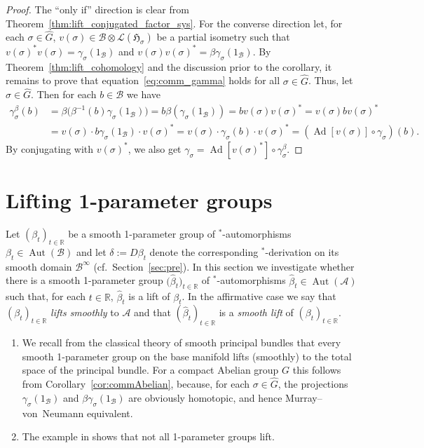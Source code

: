 \documentclass[10pt,a4paper]{amsart}
\numberwithin{equation}{section}
\newcommand*{\R}{\mathbb R}		%
\newcommand*{\tensor}{\otimes}		%
\DeclareMathOperator{\Ad}{Ad}		%
\DeclareMathOperator{\Aut}{Aut}
\newcommand*{\Star}{$^*$\nobreakdash}
\newcommand*{\hilb}{\mathfrak}		%
\newcommand*{\alg}{\mathcal}		%
\newcommand*{\hH}{\hilb{H}}			%
\newcommand*{\one}{1}				%
\newcommand*{\aA}{\alg{A}}			%
\newcommand*{\aB}{\alg{B}} 			%
\newcommand*{\End}{\mathcal{L}} %
\begin{document}
\begin{proof}
	The ``only if'' direction is clear from Theorem~\ref{thm:lift_conjugated_factor_sys}.
	For the converse direction let, for each $\sigma \in \hat G$, $v(\sigma) \in \aB \tensor \End(\hH_\sigma)$ be a partial isometry such that $v(\sigma)^* v(\sigma) = \gamma_\sigma(\one_\aB)$ and $v(\sigma) v(\sigma)^* = \beta\gamma_\sigma(\one_\aB)$.
	By Theorem~\ref{thm:lift_cohomology} and the discussion prior to the corollary, it remains to prove that equation~\eqref{eq:comm_gamma} holds for all $\sigma \in \hat G$.
	Thus, let $\sigma \in \hat G$.
	Then for each $b \in \aB$ we have
	\begin{align*}
		\gamma^\beta_\sigma(b)
		&=
		\beta\big( \beta^{-1}(b) \gamma_\sigma(\one_\aB) \big)
		= b \beta ( \gamma_\sigma(\one_\aB) )
		= b v(\sigma) v(\sigma)^*
		= v(\sigma) b v(\sigma)^*
		\\
		&=
		v(\sigma) \cdot b\gamma_\sigma(\one_\aB) \cdot v(\sigma)^*
		= v(\sigma) \cdot \gamma_\sigma(b) \cdot v(\sigma)^*
		= ( \Ad[v(\sigma)] \circ \gamma_\sigma ) (b).
	\end{align*}
	By conjugating with $v(\sigma)^*$, we also get $\gamma_\sigma = \Ad[v(\sigma)^*] \circ \gamma_\sigma^\beta$.
\end{proof}

\section{Lifting 1-parameter groups}\label{sec:1-para}

Let $(\beta_t)_{t \in \R}$ be a smooth 1-parameter group of \Star-automorphisms $\beta_t \in \Aut(\aB)$ and let $\delta := D\beta_t$ denote the corresponding \Star-derivation on its smooth domain $\aB^\infty$ (cf.\ Section~\ref{sec:pre}).
In this section we investigate whether there is a smooth 1-parameter group $\big(\hat\beta_t\big)_{t \in \R}$ of \Star-automorphisms $\hat\beta_t \in \Aut(\aA)$ such that, for each $t \in \R$, $\hat\beta_t$ is a lift of $\beta_t$.
In the affirmative case we say that $(\beta_t)_{t \in\R}$ \emph{lifts smoothly} to $\aA$ and that $(\hat\beta_t)_{t \in \R}$ is a \emph{smooth lift} of $(\beta_t)_{t \in \R}$.

\begin{Example}\quad
	\begin{enumerate}\itemsep=0pt
	\item
		We recall from the classical theory of smooth principal bundles that every smooth 1-pa\-ra\-me\-ter group on the base manifold lifts (smoothly) to the total space of the principal bundle.
		For a compact Abelian group $G$ this follows from Corollary~\ref{cor:commAbelian}, because, for each $\sigma \in \hat G$, the projections $\gamma_\sigma(\one_\aB)$ and $\beta\gamma_\sigma(\one_\aB)$ are obviously homotopic, and hence Murray--von~Neumann equivalent.
	\item
		The example in \cite[Section~4]{BCER84} shows that not all 1-parameter groups lift.
	\end{enumerate}
\end{Example}
\end{document}
